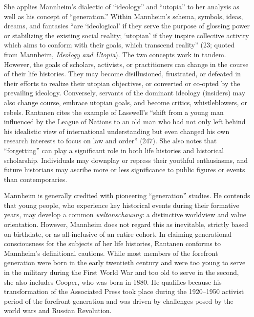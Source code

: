 \documentclass{tufte-handout}
\begin{document}
She applies Mannheim's dialectic of ``ideology'' and ``utopia'' to her
analysis as well as his concept of ``generation.'' Within Mannheim's
schema, symbols, ideas, dreams, and fantasies ``are `ideological' if
they serve the purpose of glossing power or stabilizing the existing
social reality; `utopian' if they inspire collective activity which aims
to conform with their goals, which transcend reality'' (23; quoted from
Mannheim, \emph{Ideology and Utopia}). The two concepts work in tandem.
However, the goals of scholars, activists, or practitioners can change
in the course of their life histories. They may become disillusioned,
frustrated, or defeated in their efforts to realize their utopian
objectives, or converted or co-opted by the prevailing ideology.
Conversely, servants of the dominant ideology (insiders) may also change
course, embrace utopian goals, and become critics, whistleblowers, or
rebels. Rantanen cites the example of Lasswell's ``shift from a young
man influenced by the League of Nations to an old man who had not only
left behind his idealistic view of international understanding but even
changed his own research interests to focus on law and order'' (247).
She also notes that ``forgetting'' can play a significant role in both
life histories and historical scholarship. Individuals may downplay or
repress their youthful enthusiasms, and future historians may ascribe
more or less significance to public figures or events than
contemporaries.

Mannheim is generally credited with pioneering ``generation'' studies.
He contends that young people, who experience key historical events
during their formative years, may develop a common
\emph{weltanschauung}: a distinctive worldview and value orientation.
However, Mannheim does not regard this as inevitable, strictly based on
birthdate, or as all-inclusive of an entire cohort. In claiming
generational consciousness for the subjects of her life histories,
Rantanen conforms to Mannheim's definitional cautions. While most
members of the forefront generation were born in the early twentieth
century and were too young to serve in the military during the First
World War and too old to serve in the second, she also includes Cooper,
who was born in 1880. He qualifies because his transformation of the
Associated Press took place during the 1920--1950 activist period of the
forefront generation and was driven by challenges posed by the world
wars and Russian Revolution.
\end{document}
